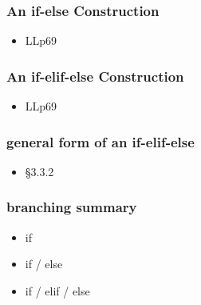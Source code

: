 \documentclass[english,14pt]{beamer}
\begin{document}

\begin{frame}[fragile]

\frametitle{An if-else Construction}

\begin{itemize}
	\item LLp69
\end{itemize}

\end{frame}


\begin{frame}[fragile]

\frametitle{An if-elif-else Construction}

\begin{itemize}
	\item LLp69
\end{itemize}

\end{frame}


\begin{frame}[fragile]

\frametitle{general form of an if-elif-else}

\begin{itemize}
	\item \S3.3.2
\end{itemize}

\end{frame}


\begin{frame}[fragile]

\frametitle{branching summary}

\begin{itemize}
	\item if
	\item if / else
	\item if / elif / else
\end{itemize}

\end{frame}

%
%
%
%
\end{document}
